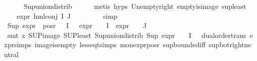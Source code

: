 \begin{isabellebody}
\ \ \ \ \isamarkupfalse%
\ Sup{\isacharunderscore}{\kern0pt}union{\isacharunderscore}{\kern0pt}distrib\isanewline
\ \ \ \ \isamarkupfalse%
\ {\isacharparenleft}{\kern0pt}metis\ {\isachardoublequoteopen}{}{\isachardot}{\kern0pt}hyps{\isachardoublequoteclose}\ Un{\isacharunderscore}{\kern0pt}empty{\isacharunderscore}{\kern0pt}right\ empty{\isacharunderscore}{\kern0pt}is{\isacharunderscore}{\kern0pt}image\ sup{\isacharunderscore}{\kern0pt}least{\isacharparenright}{\kern0pt}\isanewline
\ \ \isamarkupfalse%
\ {\isachardoublequoteopen}expr{\isacharunderscore}{\kern0pt}{}\ {\isacharparenleft}{\kern0pt}hml{\isacharunderscore}{\kern0pt}conj\ I\ J\ {\isasymPhi}{\isacharparenright}{\kern0pt}\ {\isasymle}\ {}{\isachardoublequoteclose}\isanewline
\ \ \ \ \isamarkupfalse%
\ simp\isanewline
\ \ \isamarkupfalse%
\ {}\ \isamarkupfalse%
\ {\isachardoublequoteopen}Sup\ {\isacharparenleft}{\kern0pt}{\isacharparenleft}{\kern0pt}expr{\isacharunderscore}{\kern0pt}{}\ {\isacharbackquote}{\kern0pt}\ {\isacharparenleft}{\kern0pt}pos{\isacharunderscore}{\kern0pt}r\ {\isacharparenleft}{\kern0pt}{\isasymPhi}\ {\isacharbackquote}{\kern0pt}\ I{\isacharparenright}{\kern0pt}{\isacharparenright}{\kern0pt}{\isacharparenright}{\kern0pt}\ \ {\isasymunion}\ {\isacharparenleft}{\kern0pt}expr{\isacharunderscore}{\kern0pt}{}\ {\isasymcirc}\ {\isasymPhi}{\isacharparenright}{\kern0pt}\ {\isacharbackquote}{\kern0pt}\ I\ {\isasymunion}\ {\isacharparenleft}{\kern0pt}expr{\isacharunderscore}{\kern0pt}{}\ {\isasymcirc}\ {\isasymPhi}{\isacharparenright}{\kern0pt}\ {\isacharbackquote}{\kern0pt}\ J{\isacharparenright}{\kern0pt}\ {\isasymle}\ {}{\isachardoublequoteclose}\isanewline
\ \ \ \ \isamarkupfalse%
\ {\isacharparenleft}{\kern0pt}smt\ {\isacharparenleft}{\kern0pt}z{}{\isacharparenright}{\kern0pt}\ SUP{\isacharunderscore}{\kern0pt}image\ SUP{\isacharunderscore}{\kern0pt}least\ Sup{\isacharunderscore}{\kern0pt}union{\isacharunderscore}{\kern0pt}distrib\ {\isacartoucheopen}Sup\ {\isacharparenleft}{\kern0pt}{\isacharparenleft}{\kern0pt}expr{\isacharunderscore}{\kern0pt}{}\ {\isasymcirc}\ {\isasymPhi}{\isacharparenright}{\kern0pt}\ {\isacharbackquote}{\kern0pt}\ I{\isacharparenright}{\kern0pt}\ {\isasymle}\ {}{\isacartoucheclose}\ dual{\isacharunderscore}{\kern0pt}order{\isachardot}{\kern0pt}trans\ expr{\isachardot}{\kern0pt}simps\ image{\isacharunderscore}{\kern0pt}is{\isacharunderscore}{\kern0pt}empty\ less{\isacharunderscore}{\kern0pt}eq{\isacharunderscore}{\kern0pt}t{\isachardot}{\kern0pt}simps\ mon{\isacharunderscore}{\kern0pt}expr{\isacharunderscore}{\kern0pt}{}{\isacharunderscore}{\kern0pt}pos{\isacharunderscore}{\kern0pt}r\ sup{\isachardot}{\kern0pt}bounded{\isacharunderscore}{\kern0pt}iff\ sup{\isacharunderscore}{\kern0pt}bot{\isachardot}{\kern0pt}right{\isacharunderscore}{\kern0pt}neutral{\isacharparenright}{\kern0pt}\isanewline

\end{isabellebody}
